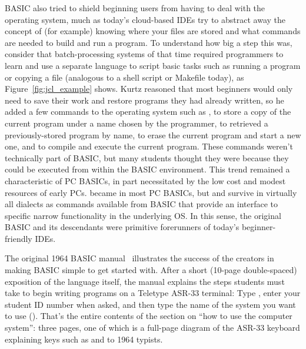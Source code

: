 BASIC also tried to shield beginning users from having to deal with
the operating system, much as today's cloud-based IDEs try
to abstract away the concept of (for example) knowing where your files
are stored and what commands are needed to build and run a program.
To understand how big a step this was, consider that batch-processing
systems of that time required programmers to learn and use a separate
 language to script basic tasks such as 
running a program or copying a file (analogous to a shell script or
Makefile today), as 
Figure~\ref{fig:jcl_example} shows.
Kurtz reasoned that most beginners would only need
to save their work and restore programs they
had already written, so he added a few commands to the operating system
such as 
, to
store a copy of the current program under a name chosen by the
programmer,   to retrieved a
previously-stored program by name,  to erase the current program 
and start a new one, and  to compile and execute the current
program.
These commands weren't technically part of BASIC, but many students
thought they were because they could be executed from within the BASIC
environment.  This trend
remained a characteristic of PC BASICs, in part necessitated by the low
cost and modest resources of early PCs.   became  in
most PC BASICs, but  and  survive in virtually all
dialects as commands available from BASIC that provide an interface to specific
narrow functionality in the underlying OS.  In this sense, the original BASIC
and its descendants were primitive forerunners of today's
beginner-friendly IDEs.


The original 1964 BASIC manual~\cite[p. 14]{dartmouth_basic_manual}
illustrates the success of the creators in making BASIC simple to get
started with.
After a short (10-page double-spaced) exposition of the language itself, the
manual explains the steps students must take to begin writing programs
on a Teletype ASR-33 terminal: Type , enter your student ID
number when asked, and then type the name of the system you want to use
().
That's the entire contents of the section on ``how to use the computer
system'': three pages, one of which is a full-page diagram of the ASR-33
keyboard explaining keys such as  and  to 1964
typists.


